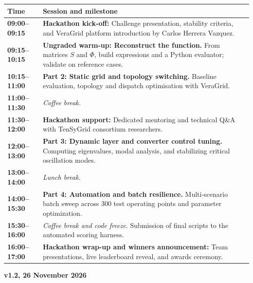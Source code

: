 \documentclass[11pt,a4paper]{article}
\newcommand{\eventversion}{v1.2, 26 November 2026}
\begin{document}
\small
\renewcommand{\arraystretch}{1.10}
\begin{tabularx}{\textwidth}{@{}p{26mm}X@{}}
  \toprule
  \textbf{\color{tgblue}Time} & \textbf{\color{tgblue}Session and milestone}                                                                                                              \\
  \midrule
  \textbf{09:00--09:15}       & \textbf{Hackathon kick-off:} Challenge presentation, stability criteria, and VeraGrid platform introduction by Carlos Herrera Vazquez.                    \\
  \textbf{09:15--10:15}       & \textbf{Ungraded warm-up: Reconstruct the function.} From matrices $S$ and $\Phi$, build expressions and a Python evaluator; validate on reference cases. \\
  \textbf{10:15--11:00}       & \textbf{Part 2: Static grid and topology switching.} Baseline evaluation, topology and dispatch optimisation with VeraGrid.                               \\
  \textbf{11:00--11:30}       & \textit{\color{tgpetrol}Coffee break.}                                                                                                                    \\
  \textbf{11:30--12:00}       & \textbf{Hackathon support:} Dedicated mentoring and technical Q\&A with TenSyGrid consortium researchers.                                                 \\
  \textbf{12:00--13:00}       & \textbf{Part 3: Dynamic layer and converter control tuning.} Computing eigenvalues, modal analysis, and stabilizing critical oscillation modes.           \\
  \textbf{13:00--14:00}       & \textit{\color{tgpetrol}Lunch break.}                                                                                                                     \\
  \textbf{14:00--15:30}       & \textbf{Part 4: Automation and batch resilience.} Multi-scenario batch sweep across 300 test operating points and parameter optimization.                 \\
  \textbf{15:30--16:00}       & \textit{\color{tgpetrol}Coffee break and code freeze.} Submission of final scripts to the automated scoring harness.                                      \\
  \textbf{16:00--17:00}       & \textbf{Hackathon wrap-up and winners announcement:} Team presentations, live leaderboard reveal, and awards ceremony.                                    \\
  \bottomrule
\end{tabularx}

\vfill
\hfill{\footnotesize\color{tggrey}\textbf{\eventversion}}
\end{document}
